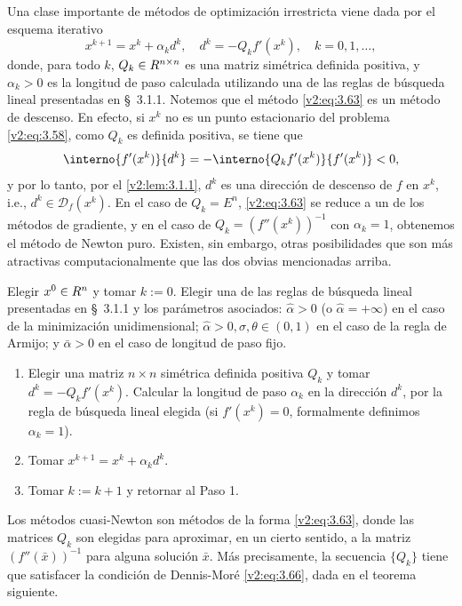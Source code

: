 Una clase importante de métodos de optimización irrestricta viene dada por el esquema iterativo
\begin{equation}
    x^{k+1} = x^k + \alpha_k d^k, \quad d^k = -Q_k f'(x^k), \quad k = 0, 1, \dots,
    \label{v2:eq:3.63}
\end{equation}
donde, para todo $k$, $Q_k \in R^{n \times n}$ es una matriz simétrica definida positiva, y $\alpha_k > 0$ es la longitud de paso calculada utilizando una de las reglas de búsqueda lineal presentadas en \S~3.1.1. Notemos que el método \eqref{v2:eq:3.63} es un método de descenso. En efecto, si $x^k$ no es un punto estacionario del problema \eqref{v2:eq:3.58}, como $Q_k$ es definida positiva, se tiene que
\begin{equation}
    \interno{f'(x^k)}{d^k} = -\interno{Q_k f'(x^k)}{f'(x^k)} < 0,
    \label{v2:eq:3.64}
\end{equation}
y por lo tanto, por el \cref{v2:lem:3.1.1}, $d^k$ es una dirección de descenso de $f$ en $x^k$, i.e., $d^k \in \mathcal{D}_f(x^k)$. En el caso de $Q_k = E^n$, \eqref{v2:eq:3.63} se reduce a un de los métodos de gradiente, y en el caso de $Q_k = (f''(x^k))^{-1}$ con $\alpha_k = 1$, obtenemos el método de Newton puro. Existen, sin embargo, otras posibilidades que son más atractivas computacionalmente que las dos obvias mencionadas arriba.

\begin{algorithm}
Elegir $x^0 \in R^n$ y tomar $k:=0$. Elegir una de las reglas de búsqueda lineal presentadas en \S~3.1.1 y los parámetros asociados: $\hat{\alpha} > 0$ (o $\hat{\alpha} = +\infty$) en el caso de la minimización unidimensional; $\hat{\alpha} > 0, \sigma, \theta \in (0, 1)$ en el caso de la regla de Armijo; y $\bar{\alpha} > 0$ en el caso de longitud de paso fijo.
\begin{enumerate}
    \item Elegir una matriz $n \times n$ simétrica definida positiva $Q_k$ y tomar $d^k = -Q_k f'(x^k)$. Calcular la longitud de paso $\alpha_k$ en la dirección $d^k$, por la regla de búsqueda lineal elegida (si $f'(x^k) = 0$, formalmente definimos $\alpha_k = 1$).
    \item Tomar $x^{k+1} = x^k + \alpha_k d^k$.
    \item Tomar $k:=k+1$ y retornar al Paso 1.
\end{enumerate}
\end{algorithm}

Los métodos cuasi-Newton son métodos de la forma \eqref{v2:eq:3.63}, donde las matrices $Q_k$ son elegidas para aproximar, en un cierto sentido, a la matriz $(f''(\bar{x}))^{-1}$ para alguna solución $\bar{x}$. Más precisamente, la secuencia $\{Q_k\}$ tiene que satisfacer la condición de Dennis-Moré \eqref{v2:eq:3.66}, dada en el teorema siguiente.

